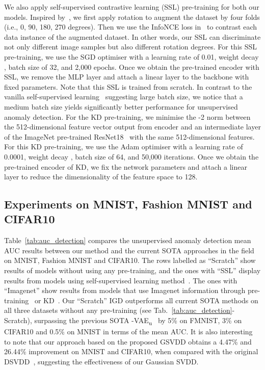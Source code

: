 \documentclass[final]{cvpr}
\begin{document}
We also apply self-supervised contrastive learning (SSL) pre-training for both our models.  Inspired by~\cite{golan2018deep}, we first apply rotation to augment the dataset by four folds (i.e., 0, 90, 180, 270 degrees). Then we use the InfoNCE loss in~\cite{chen2020simple} to contrast each data instance of the augmented dataset. In other words, our SSL can discriminate not only different image samples but also different rotation degrees.
For this SSL pre-training, we use the SGD optimiser with a learning rate of 0.01,  weight decay , batch size of 32, and 2,000 epochs. Once we obtain the pre-trained encoder with SSL, we remove the MLP layer and attach a linear layer to the backbone with fixed parameters. Note that this SSL is trained from scratch. 
In contrast to the vanilla self-supervised learning~\cite{chen2020simple} suggesting large batch size, we notice that a medium batch size yields significantly better performance for unsupervised anomaly detection. 
For the KD pre-training, we minimise the -2 norm between the 512-dimensional feature vector output from encoder and an intermediate layer of the ImageNet pre-trained ResNet18~\cite{resnet} with the same 512-dimensional features.
For this KD pre-training, we use the Adam optimiser with a learning rate of 0.0001,  weight decay , batch size of 64, and 50,000 iterations. Once we obtain the pre-trained encoder of KD, we fix the network parameters 
and attach a linear layer to reduce the dimensionality of the feature space to 128.







\subsection{Experiments on MNIST, Fashion MNIST and CIFAR10}




Table~\ref{tab:auc_detection} compares the unsupervised anomaly detection mean AUC results between our method and the current SOTA approaches in the field on MNIST, Fashion MNIST and CIFAR10.
The rows labelled as ``Scratch'' show results of models without using any pre-training, and the ones with ``SSL'' display results from models using self-supervised learning method~\cite{golan2018deep,bergman2020classification}. The ones with ``Imagenet'' show results from models that use Imagenet information through pre-training~\cite{venkataramanan2019attention} or KD~\cite{bergmann2020uninformed}. 
Our ``Scratch'' IGD 
outperforms all current SOTA methods on all three datasets without any pre-training (see Tab.~\ref{tab:auc_detection}-Scratch), surpassing the previous SOTA -VAE\textsubscript{u}~\cite{lamda-vae} by 5\% on FMNIST, 3\% on CIFAR10 and 0.5\% on MNIST in terms of the mean AUC. 
It is also interesting to note that our approach based on the proposed GSVDD obtains a 4.47\% and 26.44\% improvement on MNIST and CIFAR10, when compared with the original DSVDD~\cite{dsvdd}, suggesting the effectiveness of our Gaussian SVDD. 
\end{document}
